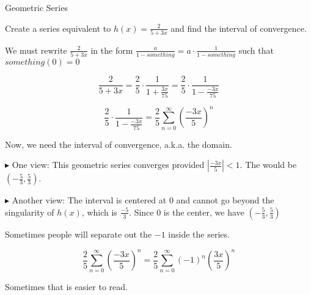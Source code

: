 \documentclass{ximera}
\begin{document}
\begin{example} Geometric Series



Create a series equivalent to $h(x) = \frac{2}{5 + 3x}$ and find the interval of convergence.



\begin{explanation}


We must rewrite $\frac{2}{5 + 3x}$ in the form $\frac{a}{1-something} = a \cdot \frac{1}{1-something}$ such that $something(0) = 0$




\[     \frac{2}{5 + 3x}  =   \frac{2}{5} \cdot \frac{1}{1 + \frac{3x}{75}}  =   \frac{2}{5} \cdot \frac{1}{1 - \frac{-3x}{75}}  \]



\[  \frac{2}{5} \cdot \frac{1}{1 - \frac{-3x}{75}}=  \frac{2}{5} \sum\limits_{n=0}^{\infty} \left(\frac{-3x}{5}\right)^n       \]





Now, we need the interval of convergence, a.k.a. the domain.  


$\blacktriangleright$ One view:  This geometric series converges provided   $\left| \frac{-3x}{5} \right| < 1$.  The would be $\left(-\frac{5}{3}, \frac{5}{3} \right)$.



$\blacktriangleright$ Another view: The interval is centered at $0$ and cannot go beyond the singularity of $h(x)$, which is $\frac{-5}{3}$.  Since $0$ is the center, we have $\left(-\frac{5}{3}, \frac{5}{3} \right)$


\end{explanation}


Sometimes people will separate out the $-1$ inside the series.

\[  \frac{2}{5} \sum\limits_{n=0}^{\infty} \left(\frac{-3x}{5}\right)^n    =   \frac{2}{5} \sum\limits_{n=0}^{\infty} (-1)^n \left(\frac{3x}{5}\right)^n   \]


Sometimes that is easier to read.


\end{example}
\end{document}
